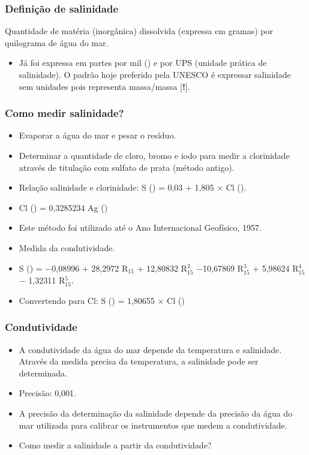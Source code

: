 \begin{frame}
\frametitle{Definição de salinidade}
    \small{
    \begin{block}{}
    Quantidade de matéria (inorgânica) dissolvida (expressa em gramas) por
    quilograma de água do mar.
    \end{block}
    }
    \pause
    \small{
    \begin{itemize}[<+-| alert@+>]
    \item Já foi expressa em partes por mil (\textperthousand) e por UPS
    (unidade prática de salinidade).  O padrão hoje preferido pela UNESCO é
    expressar salinidade sem unidades pois representa massa/massa [{\bf !}].
    \end{itemize}
    }
\end{frame}

\begin{frame}
\frametitle{Como medir salinidade?}
    \scriptsize{
    \begin{itemize}[<+-| alert@+>]
    \item Evaporar a água do mar e pesar o resíduo.
    \item Determinar a quantidade de cloro, bromo e iodo para medir a
          clorinidade através de titulação com sulfato de prata (método
          antigo).
    \item Relação salinidade e clorinidade: S (\textperthousand) = 0,03 + 1,805
          $\times$ Cl (\textperthousand).
    \item Cl (\textperthousand) = 0,3285234 Ag (\textperthousand)
    \item Este método foi utilizado até o Ano Internacional Geofísico, 1957.
    \item Medida da condutividade.
    \item S (\textperthousand) = −0,08996 + 28,2972 R$_{15}$ + 12,80832 R$^2_{15}$
          −10,67869 R$^3_{15}$ + 5,98624 R$^4_{15}$ − 1,32311 R$^5_{15}$.
    \item Convertendo para Cl: S (\textperthousand) =
          1,80655 $\times$ Cl (\textperthousand)
    \end{itemize}
    }
\end{frame}

\begin{frame}
\frametitle{Condutividade}
    \small{
    \begin{itemize}[<+-| alert@+>]
    \item A condutividade da água do mar depende da temperatura e salinidade.
          Através da medida precisa da temperatura, a salinidade pode ser
          determinada.
    \item Precisão: 0,001.
    \item A precisão da determinação da salinidade depende da precisão da água
          do mar utilizada para calibrar os instrumentos que medem a condutividade.
    \item Como medir a salinidade a partir da condutividade?
    \end{itemize}
    }
\end{frame}

